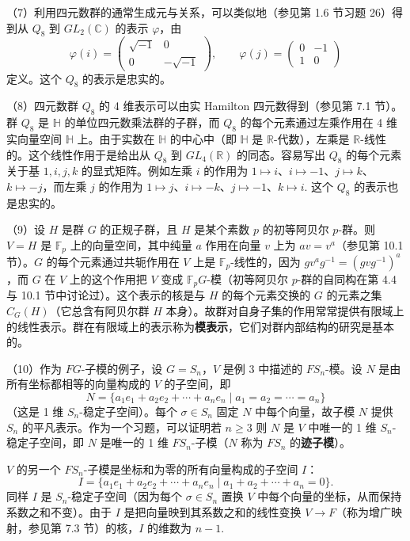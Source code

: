 （7）利用四元数群的通常生成元与关系，可以类似地（参见第 1.6 节习题 26）得到从 \(Q_8\) 到 \(GL_2(\mathbb{C})\) 的表示 \(\varphi\)，由
\[
\varphi(i) = \begin{pmatrix}\sqrt{-1} & 0\\ 0 & -\sqrt{-1}\end{pmatrix}, \qquad \varphi(j) = \begin{pmatrix}0 & -1\\ 1 & 0\end{pmatrix}
\]
定义。这个 \(Q_8\) 的表示是忠实的。

（8）四元数群 \(Q_8\) 的 4 维表示可以由实 Hamilton 四元数得到（参见第 7.1 节）。群 \(Q_8\) 是 \(\mathbb{H}\) 的单位四元数乘法群的子群，而 \(Q_8\) 的每个元素通过左乘作用在 4 维实向量空间 \(\mathbb{H}\) 上。由于实数在 \(\mathbb{H}\) 的中心中（即 \(\mathbb{H}\) 是 \(\mathbb{R}\)-代数），左乘是 \(\mathbb{R}\)-线性的。这个线性作用于是给出从 \(Q_8\) 到 \(GL_4(\mathbb{R})\) 的同态。容易写出 \(Q_8\) 的每个元素关于基 \(1, i, j, k\) 的显式矩阵。例如左乘 \(i\) 的作用为 \(1 \mapsto i\)、\(i \mapsto -1\)、\(j \mapsto k\)、\(k \mapsto -j\)，而左乘 \(j\) 的作用为 \(1 \mapsto j\)、\(i \mapsto -k\)、\(j \mapsto -1\)、\(k \mapsto i\). 这个 \(Q_8\) 的表示也是忠实的。

（9）设 \(H\) 是群 \(G\) 的正规子群，且 \(H\) 是某个素数 \(p\) 的初等阿贝尔 \(p\)-群。则 \(V = H\) 是 \(\mathbb{F}_p\) 上的向量空间，其中纯量 \(a\) 作用在向量 \(v\) 上为 \(av = v^a\)（参见第 10.1 节）。\(G\) 的每个元素通过共轭作用在 \(V\) 上是 \(\mathbb{F}_p\)-线性的，因为 \(gv^ag^{-1} = (gvg^{-1})^a\)，而 \(G\) 在 \(V\) 上的这个作用把 \(V\) 变成 \(\mathbb{F}_pG\)-模（初等阿贝尔 \(p\)-群的自同构在第 4.4 与 10.1 节中讨论过）。这个表示的核是与 \(H\) 的每个元素交换的 \(G\) 的元素之集 \(C_G(H)\)（它总含有阿贝尔群 \(H\) 本身）。故群对自身子集的作用常常提供有限域上的线性表示。群在有限域上的表示称为\textbf{模表示}，它们对群内部结构的研究是基本的。

（10）作为 \(FG\)-子模的例子，设 \(G = S_n\)，\(V\) 是例 3 中描述的 \(FS_n\)-模。设 \(N\) 是由所有坐标都相等的向量构成的 \(V\) 的子空间，即
\[
N = \{a_1e_1+a_2e_2+\cdots+a_ne_n \mid a_1 = a_2 = \cdots = a_n\}
\]
（这是 1 维 \(S_n\)-稳定子空间）。每个 \(\sigma \in S_n\) 固定 \(N\) 中每个向量，故子模 \(N\) 提供 \(S_n\) 的平凡表示。作为一个习题，可以证明若 \(n \geq 3\) 则 \(N\) 是 \(V\) 中唯一的 1 维 \(S_n\)-稳定子空间，即 \(N\) 是唯一的 1 维 \(FS_n\)-子模（\(N\) 称为 \(FS_n\) 的\textbf{迹子模}）。

\(V\) 的另一个 \(FS_n\)-子模是坐标和为零的所有向量构成的子空间 \(I\)：
\[
I = \{a_1e_1+a_2e_2+\cdots+a_ne_n \mid a_1+a_2+\cdots+a_n = 0\}.
\]
同样 \(I\) 是 \(S_n\)-稳定子空间（因为每个 \(\sigma \in S_n\) 置换 \(V\) 中每个向量的坐标，从而保持系数之和不变）。由于 \(I\) 是把向量映到其系数之和的线性变换 \(V \to F\)（称为增广映射，参见第 7.3 节）的核，\(I\) 的维数为 \(n-1\).

